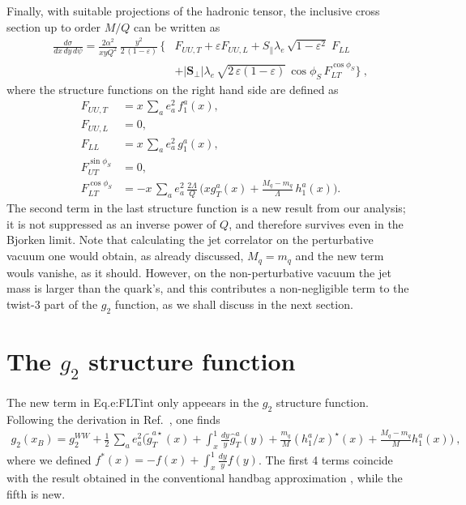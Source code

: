 \documentclass[preprintnumbers,floatfix,nofootinbib]{revtex4}
\newcommand{\xbj}{x}                   %
\newcommand{\mj}{M_q}
\begin{document}
Finally, with suitable projections of the hadronic tensor, the inclusive cross section up to order $M/Q$ can be written as
\begin{align}
\frac{d\sigma}{d\xbj \, dy\, d\psi}
=
\frac{2 \alpha^2}{\xbj y Q^2}\,
\frac{y^2}{2\,(1-\varepsilon)}\, 
\biggl\{
&F_{UU ,T} + \varepsilon F_{UU ,L}
+ S_\parallel \lambda_e\,
  \sqrt{1-\varepsilon^2}\; 
F_{LL}
\\  
&
+ |\bm{S}_\perp| \lambda_e\, \sqrt{2\,\varepsilon (1-\varepsilon)}\, 
  \cos\phi_S\, 
F_{LT}^{\cos \phi_S}
 \biggr\} \ ,
\label{e:crossdis}
\end{align}
where the structure functions on the right hand side are defined as
\begin{align}
F_{UU ,T} &= \xbj\,\sum_a e_a^2\,f_1^a(\xbj),
\\
F_{UU ,L} &= 0,
\\
F_{LL} &=\xbj\,\sum_a e_a^2\,g_1^a(\xbj),
\\
F_{UT}^{\sin \phi_S}&=0,
\label{e:FUTint}
\\
F_{LT}^{\cos \phi_S}&=-\xbj\,\sum_a e_a^2\, \frac{2\Lambda}{Q}\,
\biggl(\xbj  g_T^a(\xbj)
   + \frac{\mj -m_q}{\Lambda} \, h_{1}^a(\xbj) \biggr).
\label{e:FLTint}
\end{align}
The second term in the last structure function is a new result from our
analysis; it is not suppressed as an inverse power of $Q$, and therefore
survives even in the Bjorken limit. Note that calculating the jet correlator
on the perturbative vacuum one would obtain, as already discussed, $\mj=m_q$
and the new term wouls vanishe, as it should. However, on the non-perturbative
vacuum the jet mass is larger than the quark's, and this contributes a
non-negligible term to the twist-3 part of the $g_2$ function, as we shall
discuss in the next section.  

 

\section{The $g_2$ structure function}

The new term in Eq.{e:FLTint} only appeears in the $g_2$ structure function. Following the derivation in Ref.~\cite{ABMS}, one finds
\begin{align}
\label{e:g2}
  g_2(x_B) = g_2^{WW} + \frac{1}{2}\,\sum_a e_a^2
\biggl(
    \widetilde g_T^{a \star}(x) 
    + \int_x^1\frac{dy}{y} \widehat{g}_T^a(y) 
    + \frac{m_q}{M} (h_1^a/x)^\star(x) 
    + \frac{\mj-m_q}{M} h_1^a(x) 
\Biggr) \ ,
\end{align}
where we defined $f^*(x) = -f(x) + \int_x^1\frac{dy}{y} f(y)$. The first 4
terms coincide with the result obtained in the conventional handbag
approximation \cite{ABMS}, while the fifth is new. 
\end{document}
